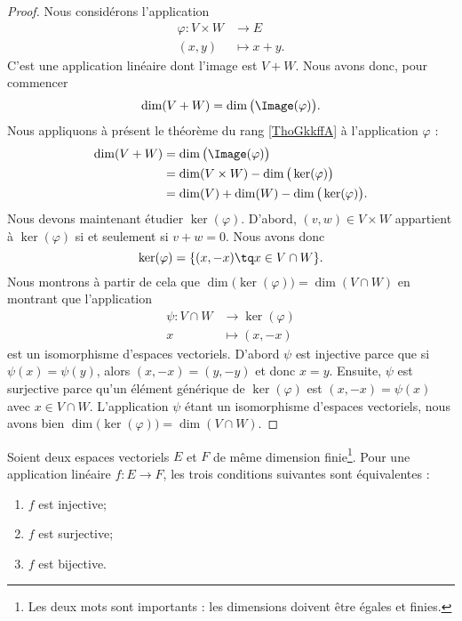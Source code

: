 \begin{proof}
	Nous considérons l'application
	\begin{equation}
		\begin{aligned}
			\varphi\colon V\times W & \to E        \\
			(x,y)                   & \mapsto x+y.
		\end{aligned}
	\end{equation}
	C'est une application linéaire dont l'image est \( V+W\). Nous avons donc, pour commencer
	\begin{equation}
		\dim(V+W)=\dim\big( \Image(\varphi) \big).
	\end{equation}
	Nous appliquons à présent le théorème du rang \ref{ThoGkkffA} à l'application \( \varphi\) :
	\begin{subequations}
		\begin{align}
			\dim(V+W) & =\dim\big( \Image(\varphi) \big)                \\
			          & =\dim(V\times W)- \dim\big( \ker(\varphi) \big) \\
			          & =\dim(V)+\dim(W)-\dim\big( \ker(\varphi) \big).
		\end{align}
	\end{subequations}
	Nous devons maintenant étudier \( \ker(\varphi)\). D'abord, \( (v,w)\in V\times W\) appartient à \( \ker(\varphi)\) si et seulement si \( v+w=0\). Nous avons donc
	\begin{equation}
		\ker(\varphi)=\{ (x,-x)\tq x\in V\cap W \}.
	\end{equation}
	Nous montrons à partir de cela que \( \dim\big( \ker(\varphi) \big)=\dim(V\cap W)\) en montrant que l'application
	\begin{equation}
		\begin{aligned}
			\psi\colon V\cap W & \to \ker(\varphi) \\
			x                  & \mapsto (x,-x)
		\end{aligned}
	\end{equation}
	est un isomorphisme d'espaces vectoriels. D'abord \( \psi\) est injective parce que si \( \psi(x)=\psi(y)\), alors \( (x,-x)=(y,-y)\) et donc \( x=y\). Ensuite, \( \psi\) est surjective parce qu'un élément générique de \( \ker(\varphi)\) est \( (x,-x)=\psi(x)\) avec \( x\in V\cap W\). L'application \( \psi\) étant un isomorphisme d'espaces vectoriels, nous avons bien \( \dim\big( \ker(\varphi) \big)=\dim(V\cap W)\).
\end{proof}

\begin{corollary}       \label{CORooCCXHooALmxKk}
	Soient deux espaces vectoriels \( E\) et \( F\) de même dimension finie\footnote{Les deux mots sont importants : les dimensions doivent être égales et finies.}. Pour une application linéaire \( f\colon E\to F\), les trois conditions suivantes sont équivalentes :
	\begin{enumerate}
		\item
		      \( f\) est injective;
		\item
		      \( f\) est surjective;
		\item
		      \( f\) est bijective.
	\end{enumerate}
\end{corollary}

